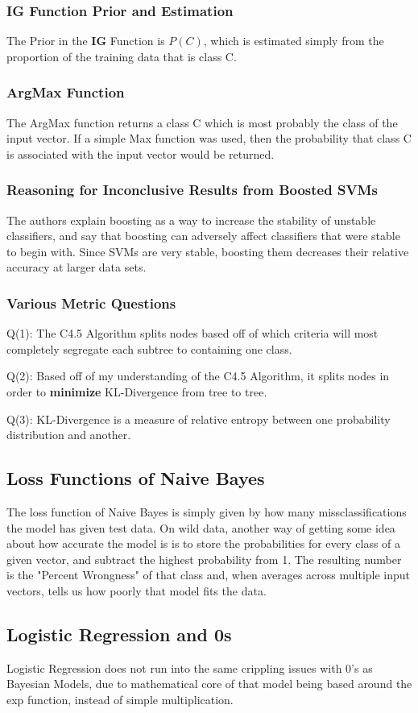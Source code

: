 \documentclass{article}
\begin{document}
\subsubsection{IG Function Prior and Estimation}
The Prior in the \textbf{IG} Function is $P(C)$, which is estimated simply from the proportion of the training data that is class C.

\subsubsection{ArgMax Function}
The ArgMax function returns a class C which is most probably the class of the input vector. If a simple Max function was used, then the probability that class C is associated with the input vector would be returned. 

\subsubsection{Reasoning for Inconclusive Results from Boosted SVMs}
The authors explain boosting as a way to increase the stability of unstable classifiers, and say that boosting can adversely affect classifiers that were stable to begin with. Since SVMs are very stable, boosting them decreases their relative accuracy at larger data sets. 

\subsubsection{Various Metric Questions}
Q(1): The C4.5 Algorithm splits nodes based off of which criteria will most completely segregate each subtree to containing one class.

Q(2): Based off of my understanding of the C4.5 Algorithm, it splits nodes in order to \textbf{minimize} KL-Divergence from tree to tree.

Q(3): KL-Divergence is a measure of relative entropy between one probability distribution and another.

\subsection{Loss Functions of Naive Bayes}
The loss function of Naive Bayes is simply given by how many missclassifications the model has given test data. On wild data, another way of getting some idea about how accurate the model is is to store the probabilities for every class of a given vector, and subtract the highest probability from 1. The resulting number is the "Percent Wrongness" of that class and, when averages across multiple input vectors, tells us how poorly that model fits the data.

\subsection{Logistic Regression and 0s}
Logistic Regression does not run into the same crippling issues with 0's as Bayesian Models, due to mathematical core of that model being based around the exp function, instead of simple multiplication. 
\end{document}
